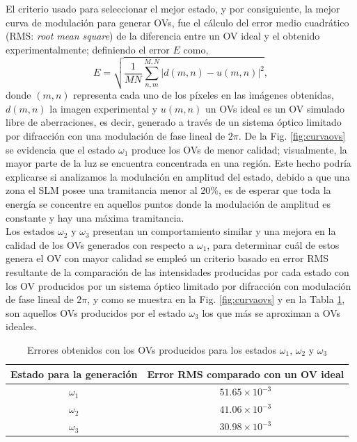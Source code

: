 El criterio usado para seleccionar el mejor estado, y por consiguiente, la mejor curva de modulación para generar OVs, fue el cálculo del error medio cuadrático (RMS: \textit{root mean square}) de la diferencia entre un OV ideal y el obtenido experimentalmente; definiendo el error $E$ como,
\begin{equation}
	E = \sqrt{\frac{1}{MN} \sum\limits_{n,m}^{M,N} |d(m,n)-u(m,n)|^2},
\end{equation}
donde $(m,n)$ representa cada uno de los píxeles en las imágenes obtenidas, $d(m,n)$ la imagen experimental y $u(m,n)$ un OVs ideal es un OV simulado libre de aberraciones, es decir, generado a través de un sistema óptico limitado por difracción con una modulación de fase lineal de $2\pi$. De la Fig. \ref{fig:curvaovs} se evidencia que el estado $\omega_1$ produce los OVs de menor calidad; visualmente, la mayor parte de la luz se encuentra concentrada en una región. Este hecho podría explicarse si analizamos la modulación en amplitud del estado, debido a que una zona el SLM posee una tramitancia menor al $20\%$, es de esperar que toda la energía se concentre en aquellos puntos donde la modulación de amplitud es constante y hay una máxima tramitancia. \\

Los estados $\omega_2$ y $\omega_3$ presentan un comportamiento similar y una mejora en la calidad de los OVs generados con respecto a $\omega_1$, para determinar cuál de estos genera el OV con mayor calidad se empleó un criterio basado en error RMS resultante de la comparación de las intensidades producidas por cada estado con los OV producidos por un sistema óptico limitado por difracción con modulación de fase lineal de $2\pi$, y como se muestra en la Fig. \ref{fig:curvaovs} y en la Tabla \ref{tab:estadosgenov}, son aquellos OVs producidos por el estado $\omega_3$ los que más se aproximan a OVs ideales. 

\begin{table}[!ht]
\centering
\begin{tabular}{|c|c|}
\hline 
Estado para la generación & Error RMS comparado con un OV ideal \\ 
\hline 
$\omega_1$ & $51.65 \times 10^{-3}$ \\ 
\hline 
$\omega_2$ & $41.06 \times 10^{-3}$ \\ 
\hline 
$\omega_3$ & $30.98 \times 10^{-3}$ \\ 
\hline 
\end{tabular} 
\caption{Errores obtenidos con los OVs producidos para los estados $\omega_1$, $\omega_2$ y $\omega_3$}
\label{tab:estadosgenov}
\end{table}


